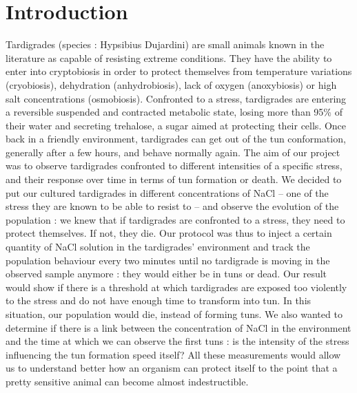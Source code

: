 \documentclass[12pt,a4paper, twocolumn]{article}
\begin{document}
\section{Introduction}
Tardigrades (species : Hypsibius Dujardini) are small animals known in the literature as capable of resisting extreme conditions. They have the ability to enter into cryptobiosis in order to protect themselves from temperature variations (cryobiosis), dehydration (anhydrobiosis), lack of oxygen (anoxybiosis) or high salt concentrations (osmobiosis). Confronted to a stress, tardigrades are entering a reversible suspended  and contracted metabolic state, losing more than 95\% of their water and secreting trehalose, a sugar aimed at protecting their cells. Once back in a friendly environment, tardigrades can get out of the tun conformation, generally after a few hours, and behave normally again.
The aim of our project was to observe tardigrades confronted to different intensities of a specific stress, and their response over time in terms of tun formation or death. We decided to put our cultured tardigrades in different concentrations of NaCl – one of the stress they are known to be able to resist to – and observe the evolution of the population : we knew that if tardigrades are confronted to a stress, they need to protect themselves. If not, they die. Our protocol was thus to inject a certain quantity of NaCl solution in the tardigrades’ environment and track the population behaviour every two minutes until no tardigrade is moving in the observed sample anymore : they would either be in tuns or dead. Our result would show if there is a threshold at which tardigrades are exposed too violently to the stress and do not have enough time to transform into tun. In this situation, our population would die, instead of forming tuns. We also wanted to determine if there is a link between the concentration of NaCl in the environment and the time at which we can observe the first tuns : is the intensity of the stress influencing the tun formation speed itself? All these measurements would allow us to understand better how an organism can protect itself to the point that a pretty sensitive animal can become almost indestructible.
\end{document}

